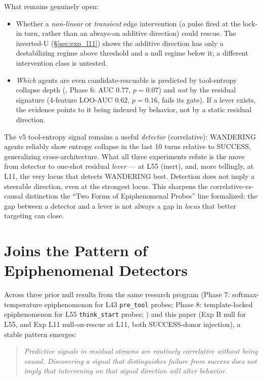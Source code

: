 \documentclass[11pt]{article}
\begin{document}
What remains genuinely open:
\begin{itemize}
\item Whether a \emph{non-linear} or \emph{transient} edge intervention (a pulse fired at the lock-in turn, rather than an always-on additive direction) could rescue. The inverted-U (\S\ref{sec:exp_l11}) shows the additive direction has only a destabilizing regime above threshold and a null regime below it; a different intervention class is untested.
\item \emph{Which} agents are even candidate-rescuable is predicted by tool-entropy collapse depth (\cite{multichannel_2026}, Phase 6: AUC $0.77$, $p=0.07$) and \emph{not} by the residual signature (4-feature LOO-AUC $0.62$, $p=0.16$, fails its gate). If a lever exists, the evidence points to it being indexed by behavior, not by a static residual direction.
\end{itemize}

The v5 tool-entropy signal remains a useful \emph{detector} (correlative): WANDERING agents reliably show entropy collapse in the last 10 turns relative to SUCCESS, generalizing cross-architecture. What all three experiments refute is the move from detector to one-shot residual \emph{lever} --- at L55 (inert), and, more tellingly, at L11, the very locus that detects WANDERING best. Detection does not imply a steerable direction, even at the strongest locus. This sharpens the correlative-vs-causal distinction the ``Two Forms of Epiphenomenal Probes'' line \cite{two_forms_2026} formalized: the gap between a detector and a lever is not always a gap in \emph{locus} that better targeting can close.

\section{Joins the Pattern of Epiphenomenal Detectors}

Across three prior null results from the same research program (Phase 7: softmax-temperature epiphenomenon for L43 \texttt{pre\_tool} probes; Phase 8: template-locked epiphenomenon for L55 \texttt{think\_start} probes; \cite{two_forms_2026}) and this paper (Exp B null for L55, and Exp L11 null-on-rescue at L11, both SUCCESS-donor injection), a stable pattern emerges:

\begin{quote}
\textit{Predictive signals in residual streams are routinely correlative without being causal. Discovering a signal that distinguishes failure from success does not imply that intervening on that signal direction will alter behavior.}
\end{quote}
\end{document}
